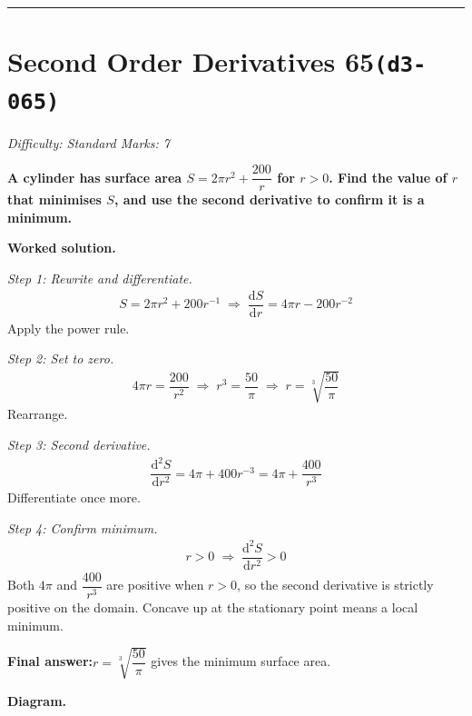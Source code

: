 \documentclass[11pt]{article}
\newcommand{\question}[1]{\par\medskip\noindent\textbf{#1}\par}
\begin{document}
\medskip\hrule

\section*{Second Order Derivatives 65\quad\small\texttt{(d3-065)}}
\textit{Difficulty: Standard \quad\textbar\quad Marks: 7}

\question{A cylinder has surface area \( S = 2\pi r^2 + \dfrac{200}{r} \) for \( r > 0 \). Find the value of \( r \) that minimises \( S \), and use the second derivative to confirm it is a minimum.}

\textbf{Worked solution.}

\textit{Step 1: Rewrite and differentiate.}
\[\begin{gathered}
S = 2\pi r^2 + 200 r^{-1} \;\Rightarrow\; \dfrac{\mathrm{d}S}{\mathrm{d}r} = 4\pi r - 200 r^{-2}
\end{gathered}\]
Apply the power rule.

\textit{Step 2: Set to zero.}
\[\begin{gathered}
4\pi r = \dfrac{200}{r^2} \;\Rightarrow\; r^3 = \dfrac{50}{\pi} \;\Rightarrow\; r = \sqrt[3]{\dfrac{50}{\pi}}
\end{gathered}\]
Rearrange.

\textit{Step 3: Second derivative.}
\[\begin{gathered}
\dfrac{\mathrm{d}^2S}{\mathrm{d}r^2} = 4\pi + 400 r^{-3} = 4\pi + \dfrac{400}{r^3}
\end{gathered}\]
Differentiate once more.

\textit{Step 4: Confirm minimum.}
\[\begin{gathered}
r > 0 \;\Rightarrow\; \dfrac{\mathrm{d}^2S}{\mathrm{d}r^2} > 0
\end{gathered}\]
Both \(4\pi\) and \(\dfrac{400}{r^3}\) are positive when \(r > 0\), so the second derivative is strictly positive on the domain. Concave up at the stationary point means a local minimum.

\begin{answerbox}
\textbf{Final answer:}\quad \(\displaystyle  r = \sqrt[3]{\dfrac{50}{\pi}} \) gives the minimum surface area.
\end{answerbox}
\textbf{Diagram.}
\end{document}
